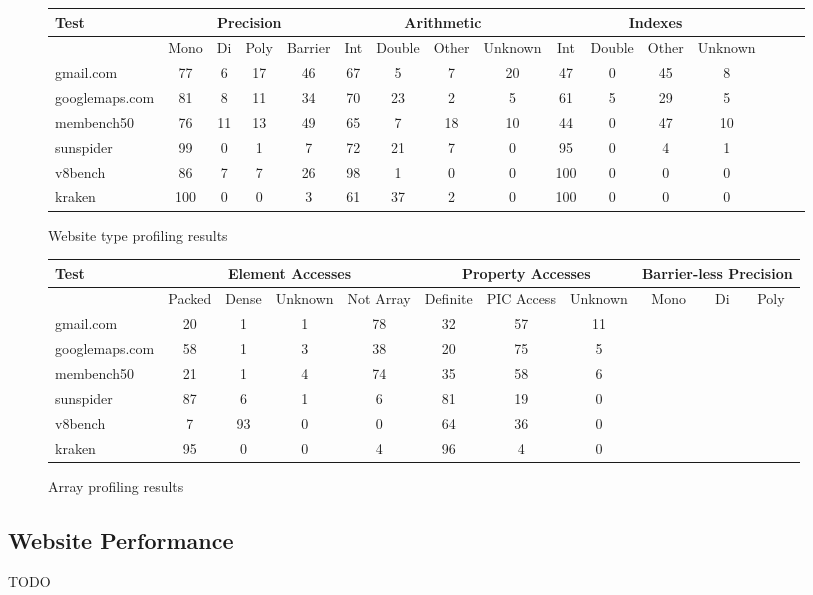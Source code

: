 \begin{figure*}
\begin{center}
\begin{tabular}{|l|ccc|c|cccc|cccc|ccc|}
\hline
Test
& \multicolumn{4}{|c|}{Precision}
& \multicolumn{4}{|c|}{Arithmetic}
& \multicolumn{4}{|c|}{Indexes} \\
\hline
& Mono & Di & Poly & Barrier
& Int & Double & Other & Unknown
& Int & Double & Other & Unknown \\
\hline
gmail.com      & 77 & 6  & 17 & 46 & 67 & 5  & 7  & 20 & 47 & 0 & 45 & 8  \\
googlemaps.com & 81 & 8  & 11 & 34 & 70 & 23 & 2  & 5  & 61 & 5 & 29 & 5  \\
membench50     & 76 & 11 & 13 & 49 & 65 & 7  & 18 & 10 & 44 & 0 & 47 & 10 \\
sunspider      & 99 & 0  & 1  & 7  & 72 & 21 & 7  & 0  & 95 & 0 & 4  & 1  \\
v8bench        & 86 & 7  & 7  & 26 & 98 & 1  & 0  & 0  & 100 & 0 & 0 & 0  \\
kraken         & 100 & 0 & 0  & 3  & 61 & 37 & 2  & 0  & 100 & 0 & 0 & 0  \\
\hline
\end{tabular}
\end{center}
\caption{Website type profiling results}
\end{figure*}

\begin{figure*}
\begin{center}
\begin{tabular}{|l|ccc|c|ccc|ccc|}
\hline
Test & \multicolumn{4}{|c|}{Element Accesses}
     & \multicolumn{3}{|c|}{Property Accesses}
     & \multicolumn{3}{|c|}{Barrier-less Precision} \\
\hline
     & Packed & Dense & Unknown & Not Array
     & Definite & PIC Access & Unknown
     & Mono & Di & Poly \\
\hline
gmail.com      & 20 & 1 & 1 & 78 & 32 & 57 & 11 \\
googlemaps.com & 58 & 1 & 3 & 38 & 20 & 75 & 5 \\
membench50     & 21 & 1 & 4 & 74 & 35 & 58 & 6 \\
sunspider      & 87 & 6 & 1 & 6  & 81 & 19 & 0 \\
v8bench        & 7  & 93 & 0 & 0 & 64 & 36 & 0 \\
kraken         & 95 & 0  & 0 & 4 & 96 & 4  & 0 \\
\hline
\end{tabular}
\end{center}
\caption{Array profiling results}
\end{figure*}

\subsection{Website Performance}

TODO
